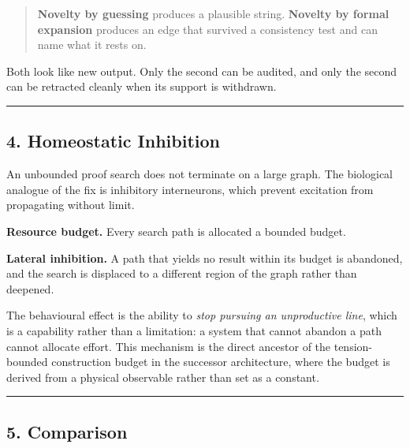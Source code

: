 \documentclass[
  11pt,
  a4paper,
]{article}
\begin{document}
\begin{quote}
\textbf{Novelty by guessing} produces a plausible string.
\textbf{Novelty by formal expansion} produces an edge that survived a
consistency test and can name what it rests on.
\end{quote}

Both look like new output. Only the second can be audited, and only the
second can be retracted cleanly when its support is withdrawn.

\begin{center}\rule{0.5\linewidth}{0.5pt}\end{center}

\subsection{4. Homeostatic Inhibition}\label{homeostatic-inhibition}

An unbounded proof search does not terminate on a large graph. The
biological analogue of the fix is inhibitory interneurons, which prevent
excitation from propagating without limit.

\textbf{Resource budget.} Every search path is allocated a bounded
budget.

\textbf{Lateral inhibition.} A path that yields no result within its
budget is abandoned, and the search is displaced to a different region
of the graph rather than deepened.

The behavioural effect is the ability to \emph{stop pursuing an
unproductive line}, which is a capability rather than a limitation: a
system that cannot abandon a path cannot allocate effort. This mechanism
is the direct ancestor of the tension-bounded construction budget in the
successor architecture, where the budget is derived from a physical
observable rather than set as a constant.

\begin{center}\rule{0.5\linewidth}{0.5pt}\end{center}

\subsection{5. Comparison}\label{comparison}
\end{document}
